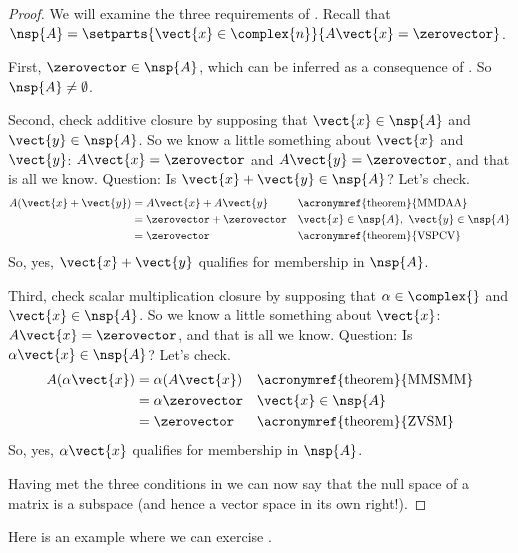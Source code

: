 \begin{proof}  We will examine the three requirements of .  Recall that $\nsp{A}=\setparts{\vect{x}\in\complex{n}}{A\vect{x}=\zerovector}$.\par
%
First, $\zerovector\in\nsp{A}$, which can be inferred as a consequence of .  So $\nsp{A}\neq\emptyset$.\par
%
Second, check additive closure by supposing that $\vect{x}\in\nsp{A}$ and $\vect{y}\in\nsp{A}$.  So we know a little something about $\vect{x}$ and $\vect{y}$:  $A\vect{x}=\zerovector$ and $A\vect{y}=\zerovector$, and that is all we know.  Question:  Is $\vect{x}+\vect{y}\in\nsp{A}$?  Let's check.
%
\begin{align*}
A(\vect{x}+\vect{y})&=A\vect{x}+A\vect{y}&&\text{\acronymref{theorem}{MMDAA}}\\
&=\zerovector+\zerovector&&\vect{x}\in\nsp{A},\ \vect{y}\in\nsp{A}\\
&=\zerovector&&\text{\acronymref{theorem}{VSPCV}}
\end{align*}
%
So, yes, $\vect{x}+\vect{y}$ qualifies for membership in $\nsp{A}$.\par
%
Third, check scalar multiplication closure by supposing that $\alpha\in\complex{\null}$ and $\vect{x}\in\nsp{A}$.  So we know a little something about $\vect{x}$:  $A\vect{x}=\zerovector$, and that is all we know.  Question:  Is $\alpha\vect{x}\in\nsp{A}$?  Let's check.
%
\begin{align*}
A(\alpha\vect{x})&=\alpha(A\vect{x})&&\text{\acronymref{theorem}{MMSMM}}\\
&=\alpha\zerovector&&\vect{x}\in\nsp{A}\\
&=\zerovector&&\text{\acronymref{theorem}{ZVSM}}
\end{align*}
%
So, yes, $\alpha\vect{x}$ qualifies for membership in $\nsp{A}$.\par
%
Having met the three conditions in  we can now say that the null space of a matrix is a subspace (and hence a vector space in its own right!).
%
\end{proof}
%
Here is an example where we can exercise .
%

